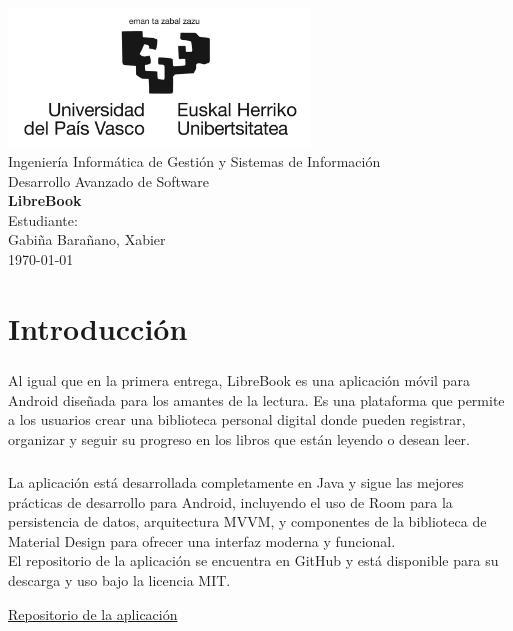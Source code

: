 \documentclass[a4paper,11pt]{report}
\begin{document}
  \begin{titlepage}
      \centering
      \includegraphics[width=0.6\textwidth]{./.img/logo.jpg}\\
      \vspace{1cm}
      \Large Ingeniería Informática de Gestión y Sistemas de Información\\
      \vspace{3cm}
      \Huge Desarrollo Avanzado de Software\\
      \vspace{0.5cm}
      \huge \textbf{LibreBook}\\
      \vspace{7.5cm}
      \Large Estudiante:\\
      \vspace{0.2cm}
      \large Gabiña Barañano, Xabier\\
      \vspace{1cm}
      \vfill
      \today
  \end{titlepage}
  \tableofcontents
  \listoffigures
  \chapter{Introducción}
    \paragraph*{}{
      Al igual que en la primera entrega, LibreBook es una aplicación móvil para Android diseñada para los amantes de la lectura. Es una plataforma que permite a los usuarios crear una biblioteca personal digital donde pueden registrar, organizar y seguir su progreso en los libros que están leyendo o desean leer.
    }
    \paragraph*{}{
      La aplicación está desarrollada completamente en Java y sigue las mejores prácticas de desarrollo para Android, incluyendo el uso de Room para la persistencia de datos\cite{room_documentation}, arquitectura MVVM\cite{mvvm_pattern}, y componentes de la biblioteca de Material Design\cite{material_design} para ofrecer una interfaz moderna y funcional.\\
      El repositorio de la aplicación se encuentra en GitHub y está disponible para su descarga y uso bajo la licencia MIT.
    }
    \begin{center}
        \color{blue}\href{https://github.com/Xabierland/DAS-Proyecto}{Repositorio de la aplicación}
    \end{center}
\end{document}
